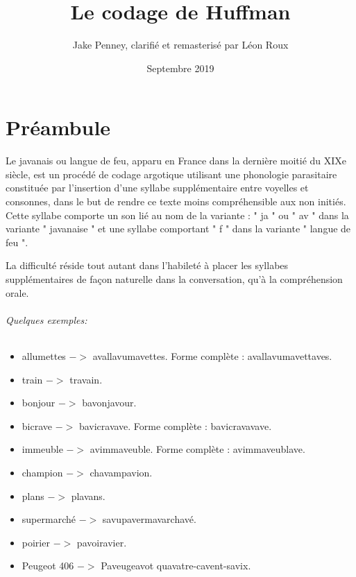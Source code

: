 \documentclass[12pt, letterpaper, twoside]{article}
\title{Le codage de Huffman}
\author{Jake Penney, clarifié et remasterisé par Léon Roux}
\date{Septembre 2019}
\begin{document}
 
\begin{titlepage}

\maketitle

\end{titlepage}

\renewcommand*\contentsname{Sommaire}
\tableofcontents

\newpage
 
\part{Préambule}
 
Le javanais ou langue de feu, apparu en France dans la dernière moitié du XIXe siècle, est un procédé de codage argotique utilisant une phonologie parasitaire constituée par l'insertion d'une syllabe supplémentaire entre voyelles et consonnes, dans le but de rendre ce texte moins compréhensible aux non initiés. Cette syllabe comporte un son lié au nom de la variante : " ja " ou " av " dans la variante " javanaise " et une syllabe comportant " f " dans la variante " langue de feu ".

La difficulté réside tout autant dans l'habileté à placer les syllabes supplémentaires de façon naturelle dans la conversation, qu'à la compréhension orale. 

\paragraph{Quelques exemples:}

\begin{itemize}
    \item allumettes $->$ avallavumavettes. Forme complète : avallavumavettaves.
    \item train $->$ travain.
    \item bonjour $->$ bavonjavour.
    \item bicrave $->$ bavicravave. Forme complète : bavicravavave.
    \item immeuble $->$ avimmaveuble. Forme complète : avimmaveublave.
    \item champion $->$ chavampavion.
    \item plans $->$ plavans.
    \item supermarché $->$ savupavermavarchavé.
    \item poirier $->$ pavoiravier.
    \item Peugeot 406 $->$ Paveugeavot quavatre-cavent-savix.
\end{itemize}
\end{document}
